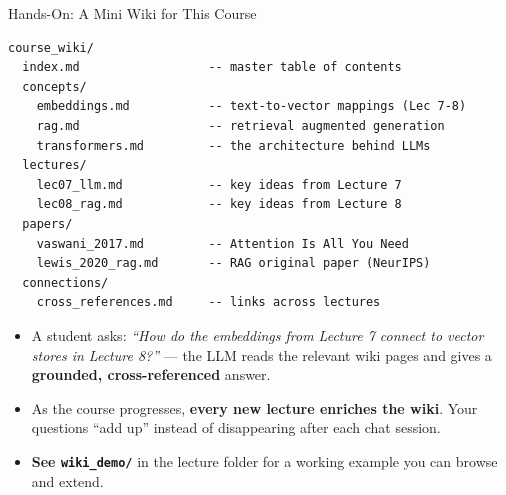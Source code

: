 \begin{frame}[fragile]{Hands-On: A Mini Wiki for This Course}
\begin{lstlisting}[basicstyle=\ttfamily\footnotesize]
course_wiki/
  index.md                  -- master table of contents
  concepts/
    embeddings.md           -- text-to-vector mappings (Lec 7-8)
    rag.md                  -- retrieval augmented generation
    transformers.md         -- the architecture behind LLMs
  lectures/
    lec07_llm.md            -- key ideas from Lecture 7
    lec08_rag.md            -- key ideas from Lecture 8
  papers/
    vaswani_2017.md         -- Attention Is All You Need
    lewis_2020_rag.md       -- RAG original paper (NeurIPS)
  connections/
    cross_references.md     -- links across lectures
\end{lstlisting}

\medskip
\begin{itemize}
\item A student asks: \emph{``How do the embeddings from Lecture 7 connect to vector stores in Lecture 8?''} --- the LLM reads the relevant wiki pages and gives a \textbf{grounded, cross-referenced} answer.
\item As the course progresses, \textbf{every new lecture enriches the wiki}. Your questions ``add up'' instead of disappearing after each chat session.
\item \textbf{See \texttt{wiki\_demo/}} in the lecture folder for a working example you can browse and extend.
\end{itemize}
\end{frame}


